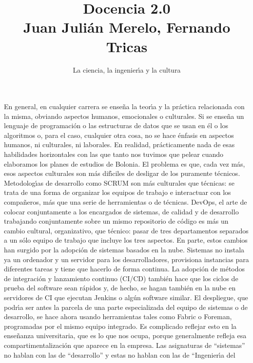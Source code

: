 \documentclass[twoside,10pt]{article}
\title{Docencia 2.0\\ \large Juan Juli\'an Merelo, Fernando 
Tricas}
\author{\LARGE La ciencia, la ingenier\'{\i}a y la cultura}
\date{}
\begin{document}
\addtocounter{page}{2}

\maketitle
\vspace*{-8ex}

\begin{multicols}{2}
En general, en cualquier carrera se ense\~na la teor\'{\i}a y la pr\'actica
relacionada con la misma, obviando aspectos humanos, emocionales o
culturales. Si se ense\~na un lenguaje de programaci\'on o las estructuras de
datos que se usan en \'el o los algoritmos o, para el caso, cualquier otra
cosa, no se hace \'enfasis en aspectos humanos, ni culturales, ni laborales.
En realidad, pr\'acticamente nada de esas habilidades horizontales con
las que tanto nos tuvimos que pelear cuando elaboramos los planes de
estudios de Bolonia.
El problema es que, cada vez m\'as, esos aspectos culturales son m\'as
dif\'{\i}ciles de desligar de los puramente t\'ecnicos. Metodolog\'{\i}as de desarrollo
como SCRUM son m\'as culturales que t\'ecnicas: se trata de una forma de
organizar los equipos de trabajo e interactuar con los compa\~neros, m\'as
que una serie de
herramientas o de t\'ecnicas. DevOps, el arte de colocar conjuntamente a los
encargados de sistemas, de calidad y de desarrollo trabajando conjuntamente
sobre un mismo repositorio de c\'odigo es m\'as un cambio cultural,
organizativo, que t\'ecnico: pasar de tres departamentos separados a un s\'olo
equipo de trabajo que incluye los tres aspectos. 
En parte, estos cambios han surgido por la adopci\'on de sistemas basados en
la nube. Sistemas no instala ya un ordenador y un servidor para los
desarrolladores, provisiona instancias para diferentes tareas y tiene que
hacerlo de forma continua. La adopci\'on de m\'etodos de integraci\'on y
lanzamiento continuo (CI/CD) tambi\'en hace que los ciclos de prueba del
software sean r\'apidos y, de hecho, se hagan tambi\'en en la nube en
servidores de CI que ejecutan Jenkins o alg\'un software similar. El
despliegue, que podr\'{\i}a ser antes la parcela de una parte especializada del
equipo de sistemas o de desarrollo, se hace ahora usando herramientas tales
como Fabric o Foreman, programadas por el mismo equipo integrado.
Es complicado reflejar esto en la ense\~nanza universitaria, que es lo que
nos ocupa, porque generalmente refleja esa compartimentalizaci\'on que
aparece en la empresa. Las asignaturas de ``sistemas'' no hablan con las de
``desarrollo'' y estas no hablan con las de ``Ingenier\'{\i}a del

\end{multicols}
\end{document}
